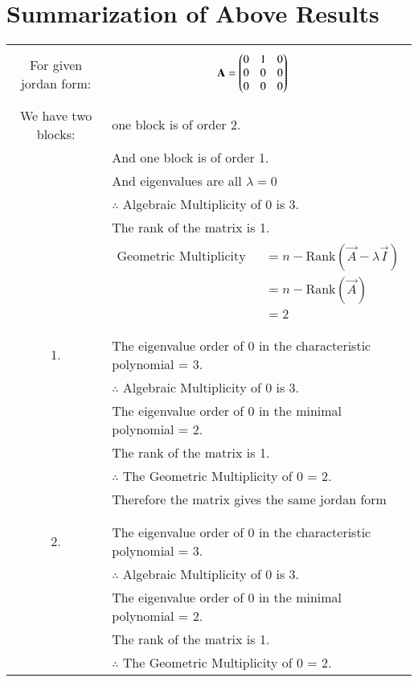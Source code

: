\documentclass[journal,12pt]{IEEEtran}
\begin{document}
\section{\textbf{Summarization of Above Results}}
\renewcommand{\thetable}{3}
\begin{longtable}{|c|l|}
    \hline
	\multirow{1}{*}{For given jordan form:}
	&\parbox{3cm}{\begin{align*}
	    \mathbf{A}&=\begin{pmatrix}0&1&0\\0&0&0\\0&0&0\end{pmatrix}
	\end{align*}}\\
    We have two blocks:&one block is of order 2.\\
    &And one block is of order 1.\\
    &And eigenvalues are all $\lambda=0$\\
    &$\therefore$ Algebraic Multiplicity of 0 is 3.\\
    &The rank of the matrix is 1.\\
    &\parbox{6cm}{\begin{align*}
        \mbox{Geometric Multiplicity of 0}&=n-\mbox{Rank}(\vec{A}-\lambda\vec{I})\\
        &=n-\mbox{Rank}(\vec{A})\\
        &=2
    \end{align*}}\\
	&\\
	\hline
	&\\
	1.&The eigenvalue order of 0 in the characteristic polynomial = 3.\\
	&$\therefore$ Algebraic Multiplicity of 0 is 3.\\
	&The eigenvalue order of 0 in the minimal polynomial = 2.\\
    &The rank of the matrix is 1.\\
    &$\therefore$ The Geometric Multiplicity of 0 = 2.\\
    &Therefore the matrix gives the same jordan form\\
	& \\
	\hline
	&\\
	2.&The eigenvalue order of 0 in the characteristic polynomial = 3.\\
	&$\therefore$ Algebraic Multiplicity of 0 is 3.\\
	&The eigenvalue order of 0 in the minimal polynomial = 2.\\
    &The rank of the matrix is 1.\\
    &$\therefore$ The Geometric Multiplicity of 0 = 2.\\

\end{longtable}
\end{document}
